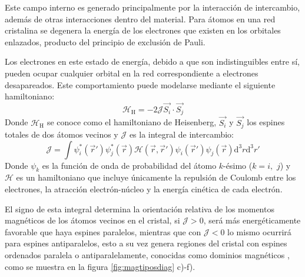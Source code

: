 \documentclass[../main.tex]{subfiles}
\begin{document}
Este campo interno es generado principalmente por la interacción de intercambio, además de otras interacciones dentro del material. Para átomos en una red cristalina se degenera la energía de los electrones que existen en los orbitales enlazados, producto del principio de exclusión de Pauli.

Los electrones en este estado de energía, debido a que son indistinguibles entre sí, pueden ocupar cualquier orbital en la red correspondiente a electrones desapareados. Este comportamiento puede modelarse mediante el siguiente hamiltoniano:
\begin{equation}
    \mathcal{H}_\text{H}=-2\mathcal{J}\vec{S_i}\cdot\vec{S_j}
    \label{eq:hamiltonianoheisenberg}
\end{equation}
Donde $\mathcal{H}_\text{H}$ se conoce como el hamiltoniano de Heisenberg, $\vec{S_i}$ y $\vec{S_j}$ los espines totales de dos átomos vecinos y $\mathcal{J}$ es la integral de intercambio:
\begin{equation}
    \mathcal{J}=\int \psi^\ast_i(\vec{r}')\psi^\ast_j(\vec{r})\mathcal{H}(\vec{r},\vec{r}')\psi_i(\vec{r}')\psi_j(\vec{r})\text{d}^3r\text{d}^3r'
    \label{eq:intintercambio}
\end{equation}
Donde $\psi_k$ es la función de onda de probabilidad del átomo $k$-ésimo ($k=i,$ $j$) y $\mathcal{H}$ es un hamiltoniano que incluye únicamente la repulsión de Coulomb entre los electrones, la atracción electrón-núcleo y la energía cinética de cada electrón.

El signo de esta integral determina la orientación relativa de los momentos magnéticos de los átomos vecinos en el cristal, si $\mathcal{J}>0$, será más energéticamente favorable que haya espines paralelos, mientras que con $\mathcal{J}<0$ lo mismo ocurrirá para espines antiparalelos, esto a su vez genera regiones del cristal con espines ordenados paralela o antiparalelamente, conocidas como dominios magnéticos \cite{coey2010magnetism}, como se muestra en la figura \ref{fig:magtiposdiag} c)-f).
\end{document}
